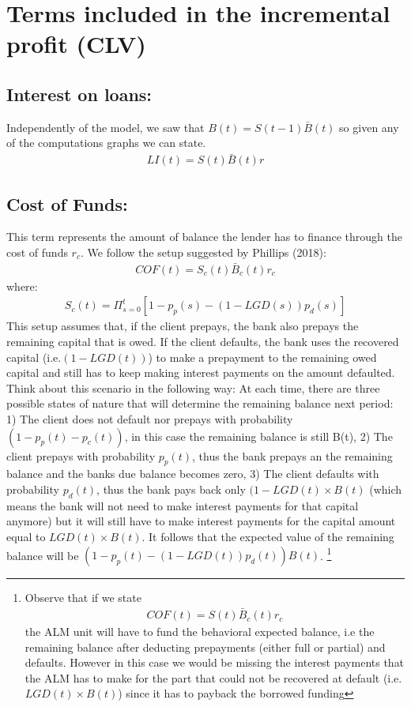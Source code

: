 \section{ Terms included in the incremental profit (CLV)}
\subsection{ Interest on loans: }
Independently of the model, we saw that $B(t) = S(t-1)\bar{B}(t)$ so given any of the computations graphs we can state.
\begin{align}
LI(t) = S(t)\bar{ B}(t)r \label{eq:li}
\end{align}


\subsection{  Cost of Funds: }
This term represents the amount of balance the lender has to finance through the cost of funds $r_c$. We follow the setup suggested by Phillips (2018):
\begin{align}
COF(t) = S_c(t)\bar{ B}_c(t)r_c
\end{align}
where: 
\begin{align}
S_c(t)= \Pi_{s=0}^t [1- p_p(s)-(1-LGD(s))p_d(s) ]
\end{align}
This setup assumes that, if the client prepays, the bank also prepays the remaining capital that is owed. If the client defaults, the bank uses the recovered capital (i.e.$(1-LGD(t))$) to make a prepayment to the remaining owed capital and still has to keep making interest payments on the amount defaulted. \\

Think about this scenario in the following way: At each time, there are three possible states of nature that will determine the remaining balance next period: 1) The client does not default nor prepays with probability $(1-p_p(t)-p_c(t))$, in this case the remaining balance is still B(t), 2) The client prepays with probability $p_p(t)$, thus the bank prepays an the remaining balance and the banks due balance becomes zero, 3) The client defaults with probability $p_d(t)$, thus the bank pays back only $(1-LGD(t) \times  B(t)$ (which means the bank will not need to make interest payments for that capital anymore) but it will still have to make interest payments for the capital amount equal to $LGD(t) \times B(t)$. It follows that the expected value of the remaining balance will be $(1-p_p(t)-(1-LGD(t))p_d(t))B(t)$.
\footnote{ 
Observe that if we state
\begin{align}
    COF(t) = S(t)\bar{B}_c(t)r_c
\end{align}
the ALM unit will have to fund the behavioral expected balance, i.e the remaining balance after deducting prepayments (either full or partial) and defaults. However in this case we would be missing the interest payments that the ALM has to make for the part that could not be recovered at default (i.e. $LGD(t) \times B(t)$) since it has to payback the borrowed funding  

}
